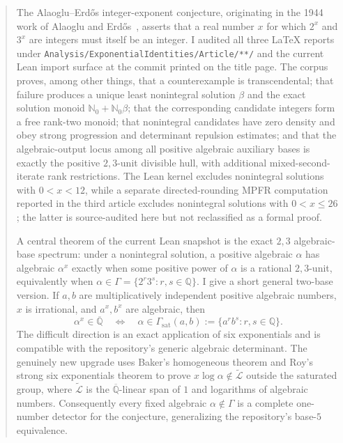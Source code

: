 \documentclass[11pt,oneside]{article}
\theoremstyle{definition}
\theoremstyle{remark}
\newcommand{\Nzero}{\mathbb N_0}
\newcommand{\Q}{\mathbb Q}
\newcommand{\Qbar}{\overline{\mathbb Q}}
\newcommand{\GammaSat}{\Gamma_{\mathrm{sat}}}
\newcommand{\LL}{\widetilde{\mathcal L}}
\begin{document}
\begin{abstract}
The Alaoglu--Erd\H{o}s integer-exponent conjecture, originating in the 1944 work of Alaoglu and Erd\H{o}s~\cite{AlaogluErdos1944}, asserts that a real number $x$ for which
$2^x$ and $3^x$ are integers must itself be an integer.  I audited all three LaTeX reports
under \texttt{Analysis/ExponentialIdentities/Article/**/} and the current Lean import surface
at the commit printed on the title page.  The corpus proves, among other things, that a
counterexample is transcendental; that failure produces a unique least nonintegral solution
$\beta$ and the exact solution monoid $\Nzero+\Nzero\beta$; that the corresponding candidate
integers form a free rank-two monoid; that nonintegral candidates have zero density and obey
strong progression and determinant repulsion estimates; and that the algebraic-output locus
among all positive algebraic auxiliary bases is exactly the positive $2,3$-unit divisible
hull, with additional mixed-second-iterate rank restrictions.  The Lean kernel excludes
nonintegral solutions with $0<x<12$, while a separate directed-rounding MPFR computation
reported in the third article excludes nonintegral solutions with $0<x\le 26$; the latter is
source-audited here but not reclassified as a formal proof.

A central theorem of the current Lean snapshot is the exact $2,3$ algebraic-base spectrum:
under a nonintegral solution, a positive algebraic $\alpha$ has algebraic $\alpha^x$ exactly
when some positive power of $\alpha$ is a rational $2,3$-unit, equivalently when
$\alpha\in\Gamma=\{2^r3^s:r,s\in\Q\}$.  I give a short general two-base version.  If
$a,b$ are multiplicatively independent positive algebraic numbers, $x$ is irrational, and
$a^x,b^x$ are algebraic, then
\[
  \alpha^x\in\Qbar
  \quad\Longleftrightarrow\quad
  \alpha\in\GammaSat(a,b):=\{a^r b^s:r,s\in\Q\}.
\]
The difficult direction is an exact application of six exponentials and is compatible with
the repository's generic algebraic determinant.  The genuinely new upgrade uses Baker's
homogeneous theorem and Roy's strong six exponentials theorem to prove
$x\log\alpha\notin\LL$ outside the saturated group, where $\LL$ is the $\Qbar$-linear
span of $1$ and logarithms of algebraic numbers.  Consequently every fixed algebraic
$\alpha\notin\Gamma$ is a complete one-number detector for the conjecture, generalizing
the repository's base-$5$ equivalence.


\end{abstract}
\end{document}
